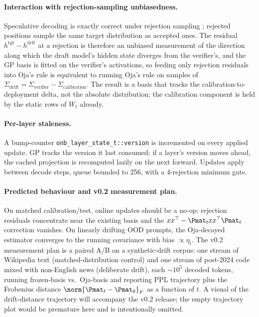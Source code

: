 \documentclass[11pt]{article}
\begin{document}
\paragraph{Interaction with rejection-sampling unbiasedness.}
Speculative decoding is exactly correct under rejection sampling
\cite{leviathan2023speculative}; rejected positions sample the same
target distribution as accepted ones. The residual
$h^\text{tgt}-h^\text{drft}$ at a rejection is therefore an unbiased
measurement of the direction along which the draft model's hidden state
diverges from the verifier's, and the GP basis is fitted on the
verifier's activations, so feeding only rejection residuals into Oja's
rule is equivalent to running Oja's rule on samples of
$\Sigma_\text{drift}=\Sigma_\text{verifier}-\Sigma_\text{calibration}$.
The result is a basis that tracks the calibration-to-deployment delta,
not the absolute distribution; the calibration component is held by the
static rows of $W_t$ already.

\paragraph{Per-layer staleness.}  A bump-counter
\texttt{onb\_layer\_state\_t::version} is incremented on every applied
update. GP tracks the version it last consumed; if a layer's version
moves ahead, the cached projection is recomputed lazily on the next
forward. Updates apply between decode steps, queue bounded to 256, with
a 4-rejection minimum gate.

\paragraph{Predicted behaviour and v0.2 measurement plan.}
On matched calibration/test, online updates should be a no-op:
rejection residuals concentrate near the existing basis and the
$xx^\top-\Pmat_t xx^\top\Pmat_t$ correction vanishes. On linearly
drifting OOD prompts, the Oja-decayed estimator converges to the
running covariance with bias $\propto\eta_t$. The v0.2 measurement plan
is a paired A/B on a synthetic-drift corpus: one stream of Wikipedia
text (matched-distribution control) and one stream of post-2024 code
mixed with non-English news (deliberate drift), each $\sim 10^5$
decoded tokens, running frozen-basis vs.\ Oja-basis and reporting PPL
trajectory plus the Frobenius distance $\norm{\Pmat_t-\Pmat_0}_F$ as a
function of $t$. A visual of the drift-distance trajectory will
accompany the v0.2 release; the empty trajectory plot would be
premature here and is intentionally omitted.
\end{document}
